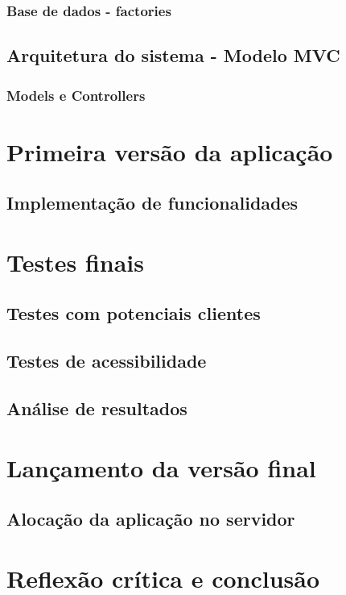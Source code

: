 \documentclass[11pt, twoside]{report}
\begin{document}
	
	
	\subsection{Base de dados - factories}
	\section{Arquitetura do sistema - Modelo MVC}
	\subsection{Models e Controllers}
	
	\chapter{Primeira versão da aplicação}
	\section{Implementação de funcionalidades}
	
	\chapter{Testes finais}
	\section{Testes com potenciais clientes}
	\section{Testes de acessibilidade}
	\section{Análise de resultados}
	
	\chapter{Lançamento da versão final}
	\section{Alocação da aplicação no servidor}
	
	
	\chapter{Reflexão crítica e conclusão}
	
\end{document}
